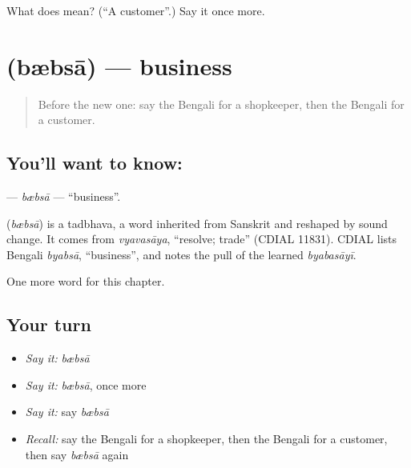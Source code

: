 \begin{tcolorbox}[breakable,colback=teal!4,colframe=teal!35!black,title={Before you move on}]
What does  mean? (\textquotedblleft{}A customer\textquotedblright{}.) Say it once more.
\end{tcolorbox}
\section[\texorpdfstring{\bn{ব্যবসা} (bæbsā)}{ব্যবসা (bæbsā)}]{ (bæbsā) — business}

\label{lesson:BN-C207-bbsa}



\begin{quote}
Before the new one: say the Bengali for a shopkeeper, then the Bengali for a customer.
\end{quote}

\subsection*{You'll want to know: }
\textbf{} — \emph{bæbsā} — \textquotedblleft{}business\textquotedblright{}.

\begin{cousinweb}
\textbf{} (\emph{bæbsā}) is a tadbhava, a word inherited from Sanskrit and reshaped by sound change. It comes from \emph{vyavasāya}, \textquotedblleft{}resolve; trade\textquotedblright{} (CDIAL 11831). CDIAL lists Bengali \emph{byabsā}, \textquotedblleft{}business\textquotedblright{}, and notes the pull of the learned \emph{byabasāyī}.
\end{cousinweb}

\begin{grammarlens}[title={What you've built}]
One more word for this chapter.
\end{grammarlens}

\subsection*{Your turn}
\begin{itemize}
\raggedright
  \item \emph{Say it:} \emph{bæbsā}
  \item \emph{Say it:} \emph{bæbsā}, once more
  \item \emph{Say it:} say \emph{bæbsā}
  \item \emph{Recall:} say the Bengali for a shopkeeper, then the Bengali for a customer, then say \emph{bæbsā} again
\end{itemize}

